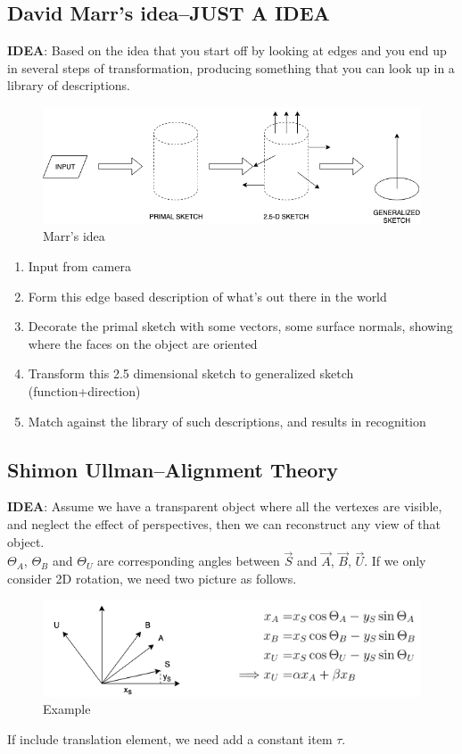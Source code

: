 \documentclass[12pt]{book}
\begin{document}
\subsection{David Marr's idea--JUST A IDEA}
\textbf{IDEA}: Based on the idea that you start off by looking at edges and you end up in several steps of transformation, producing something that you can look up in a library of descriptions.\\
\begin{figure}[ht]
	\centering
	\includegraphics[scale=0.6]{Figure/Figure9_1.png}
	\caption{Marr's idea}
\end{figure}
\begin{enumerate}
	\item Input from camera
	\item Form this edge based description of what's out there in the world
	\item Decorate the primal sketch with some vectors, some surface normals, showing where the faces on the object are oriented
	\item Transform this 2.5 dimensional sketch to generalized sketch (function+direction)
	\item Match against the library of such descriptions, and results in recognition
\end{enumerate}
\subsection{Shimon Ullman--Alignment Theory}
\textbf{IDEA}: Assume we have a transparent object where all the vertexes are visible, and neglect the effect of perspectives, then we can reconstruct any view of that object.\\
\indent $\Theta_A$, $\Theta_B$ and $\Theta_U$ are corresponding angles between $\vec S$ and $\vec A$, $\vec B$, $\vec U$. If we only consider 2D rotation, we need two picture as follows.\\
\begin{figure}[ht]
	\centering
	\includegraphics[scale=0.6]{Figure/Figure9_2.png}
	\caption{Example}
\end{figure}
\newline
\indent If include translation element, we need add a constant item $\tau$.  
\end{document}
